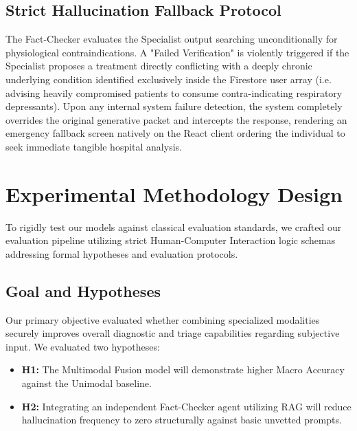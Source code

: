 \documentclass[11pt,a4paper]{article}
\begin{document}
\subsection{Strict Hallucination Fallback Protocol}
The Fact-Checker evaluates the Specialist output searching unconditionally for physiological contraindications. A "Failed Verification" is violently triggered if the Specialist proposes a treatment directly conflicting with a deeply chronic underlying condition identified exclusively inside the Firestore user array (i.e. advising heavily compromised patients to consume contra-indicating respiratory depressants). Upon any internal system failure detection, the system completely overrides the original generative packet and intercepts the response, rendering an emergency fallback screen natively on the React client ordering the individual to seek immediate tangible hospital analysis.


\section{Experimental Methodology Design}

To rigidly test our models against classical evaluation standards, we crafted our evaluation pipeline utilizing strict Human-Computer Interaction logic schemas addressing formal hypotheses and evaluation protocols.

\subsection{Goal and Hypotheses}
Our primary objective evaluated whether combining specialized modalities securely improves overall diagnostic and triage capabilities regarding subjective input. We evaluated two hypotheses:
\begin{itemize}
    \item \textbf{H1:} The Multimodal Fusion model will demonstrate higher Macro Accuracy against the Unimodal baseline.
    \item \textbf{H2:} Integrating an independent Fact-Checker agent utilizing RAG will reduce hallucination frequency to zero structurally against basic unvetted prompts. 
\end{itemize}
\end{document}
